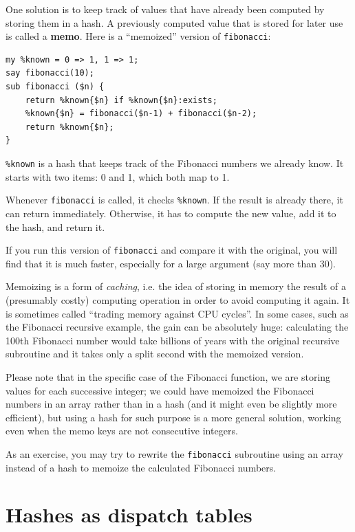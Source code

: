 One solution is to keep track of values that have already been
computed by storing them in a hash.  A previously computed value
that is stored for later use is called a {\bf memo}.  Here is a
``memoized'' version of {\tt fibonacci}:

\begin{verbatim}
my %known = 0 => 1, 1 => 1;
say fibonacci(10);
sub fibonacci ($n) {
    return %known{$n} if %known{$n}:exists;
    %known{$n} = fibonacci($n-1) + fibonacci($n-2);
    return %known{$n};
}
\end{verbatim}
%

\verb'%known' is a hash that keeps track of the Fibonacci
numbers we already know.  It starts with
two items: 0 and 1, which both map to 1.

Whenever {\tt fibonacci} is called, it checks \verb'%known'.
If the result is already there, it can return
immediately.  Otherwise, it has to 
compute the new value, add it to the hash, and return it.

If you run this version of {\tt fibonacci} and compare it with
the original, you will find that it is much faster, especially for a large argument (say more than 30).

Memoizing is a form of \emph{caching}, i.e. the idea of storing 
in memory the result of a (presumably costly) computing 
operation in order to avoid computing it again. It is 
sometimes called ``trading memory against CPU cycles''.  In 
some cases, such as the Fibonacci recursive example, the gain 
can be absolutely huge: calculating the 100th Fibonacci 
number would take billions of years with the original recursive 
subroutine and it takes only a split second with the memoized 
version.

Please note that in the specific case of the Fibonacci function, 
we are storing values for each successive integer; we could 
have memoized the Fibonacci numbers in an array rather than 
in a hash (and it might even be slightly more efficient), but 
using a hash for such purpose is a more general solution, 
working even when the memo keys are not consecutive integers.

As an exercise, you may try to rewrite the {\tt fibonacci} subroutine 
using an array instead of a hash to memoize the calculated 
Fibonacci numbers.


\section{Hashes as dispatch tables}
\label{dispatch}

